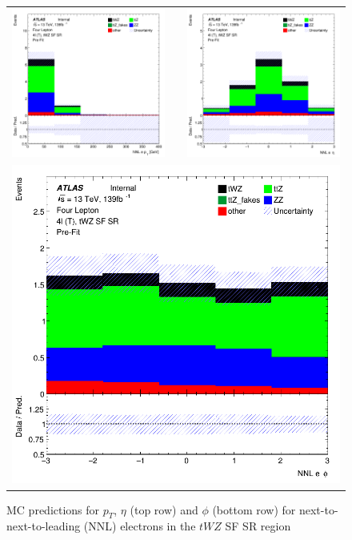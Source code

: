 \clearpage

\begin{figure}[htbp]
\centering
  \begin{tabular}{ccc}

    \includegraphics[width=.2\textwidth]{figures/PreFitPlots/lep4_tWZ_4T_SF_NNL_el_pt} & &
    \includegraphics[width=.2\textwidth]{figures/PreFitPlots/lep4_tWZ_4T_SF_NNL_el_eta} \\
    \multicolumn{3}{c}{\includegraphics[width=.2\textwidth]{figures/PreFitPlots/lep4_tWZ_4T_SF_NNL_el_phi}}
  \end{tabular}
    \caption{MC predictions for $p_{T}$, $\eta$ (top row) and $\phi$ (bottom row) for next-to-next-to-leading (NNL) electrons in the $tWZ$ SF SR region}
  \label{fig:4lep-SF-SR-electronPlots}
\end{figure}


